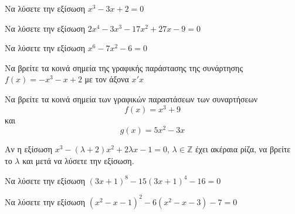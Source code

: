 \documentclass{presentation}
\begin{document}
\begin{askisi}
  Να λύσετε την εξίσωση $x^3-3x+2=0$


\end{askisi}

\begin{askisi}
  Να λύσετε την εξίσωση $2x^4-3x^3-17x^2+27x-9=0$


\end{askisi}

\begin{askisi}
  Να λύσετε την εξίσωση $x^6-7x^2-6=0$


\end{askisi}

\begin{askisi}
  Να βρείτε τα κοινά σημεία της γραφικής παράστασης της συνάρτησης $f(x)=-x^3-x+2$ με τον άξονα $x'x$


\end{askisi}

\begin{askisi}
  Να βρείτε τα κοινά σημεία των γραφικών παραστάσεων των συναρτήσεων $$f(x)=x^3+9$$ και $$g(x)=5x^2-3x$$


\end{askisi}

\begin{askisi}
  Αν η εξίσωση $x^3-(λ+2)x^2+2λx-1=0$, $λ\in\mathbb{Z}$ έχει ακέραια ρίζα, να βρείτε το $λ$ και μετά να λύσετε την εξίσωση.


\end{askisi}

\begin{askisi}
  Να λύσετε την εξίσωση $(3x+1)^8-15(3x+1)^4-16=0$


\end{askisi}

\begin{askisi}
  Να λύσετε την εξίσωση $(x^2-x-1)^2-6(x^2-x-3)-7=0$


\end{askisi}
\end{document}
